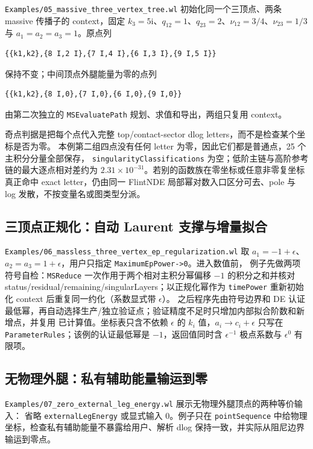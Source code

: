 \documentclass[11pt,a4paper]{ctexart}
\newcommand{\ii}{\mathrm i}
\begin{document}
\texttt{Examples/05\_massive\_three\_vertex\_tree.wl} 初始化同一个三顶点、两条 massive 传播子的
context，固定 $k_3=5\ii$、$q_{12}=1$、$q_{23}=2$、$\nu_{12}=3/4$、$\nu_{23}=1/3$ 与
$a_1=a_2=a_3=1$。原点列
\begin{verbatim}
{{k1,k2},{8 I,2 I},{7 I,4 I},{6 I,3 I},{9 I,5 I}}
\end{verbatim}
保持不变；中间顶点外腿能量为零的点列
\begin{verbatim}
{{k1,k2},{8 I,0},{7 I,0},{6 I,0},{9 I,0}}
\end{verbatim}
由第二次独立的 \texttt{MSEvaluatePath} 规划、求值和导出，两组只复用 context。

奇点判据是把每个点代入完整 top/contact-sector dlog letters，而不是检查某个坐标是否为零。
本例第二组四点没有任何 letter 为零，因此它们都是普通点，25 个主积分分量全部保存，
\texttt{singularityClassifications} 为空；低阶主链与高阶参考链的最大逐点相对差约为
$2.31\times10^{-31}$。若别的函数族在零坐标或任意非零复坐标真正命中 exact letter，仍由同一
FlintNDE 局部幂对数入口区分可去、pole 与 log 发散，不按变量名或图类型分派。

\subsection{三顶点正规化：自动 Laurent 支撑与增量拟合}

\texttt{Examples/06\_massless\_three\_vertex\_ep\_regularization.wl} 取
$a_1=-1+\epsilon$、$a_2=a_3=1+\epsilon$，用户只指定 \texttt{MaximumEpPower->0}。进入数值前，
例子先做两项符号自检：\texttt{MSReduce} 一次作用于两个相对主积分幂偏移 $-1$ 的积分之和并核对
status/residual/remaining/singularLayers；以正规化幂作为 \texttt{timePower} 重新初始化 context
后重复同一约化（系数显式带 $\epsilon$）。
之后程序先由符号边界和 DE
认证最低幂，再自动选择生产/独立验证点；验证精度不足时只增加内部拟合阶数和新增点，并复用
已计算值。坐标表只含不依赖 $\epsilon$ 的 $k_i$ 值，$a_i\to c_i+\epsilon$ 只写在
\texttt{ParameterRules}；该例的认证最低幂是 $-1$，返回值同时含 $\epsilon^{-1}$ 极点系数与
$\epsilon^0$ 有限项。

\subsection{无物理外腿：私有辅助能量输运到零}

\texttt{Examples/07\_zero\_external\_leg\_energy.wl} 展示无物理外腿顶点的两种等价输入：
省略 \texttt{externalLegEnergy} 或显式输入 0。例子只在 \texttt{pointSequence} 中给物理
坐标，检查私有辅助能量不暴露给用户、解析 dlog 保持一致，并实际从阻尼边界输运到零点。
\end{document}
